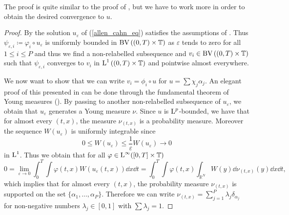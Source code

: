 \begin{remark}
	The proof is quite similar to the proof of , but we have to work more in order to obtain the desired convergence to $ u $.
\end{remark}

\begin{proof}
	By  the solution $ u_{ \varepsilon } $ of (\ref{allen_cahn_eq}) satisfies the assumptions of .
	Thus $ \psi_{ \varepsilon, i } \coloneqq \varphi_{ i } \circ u_{ 
	\varepsilon } $ is uniformly bounded in $ \operatorname{BV} \left( ( 0 , T ) \times 
	\operatorname{\mathbb{T}} \right) $ as $ \varepsilon $ tends to zero for all $ 1 \leq i 
	\leq P $ and thus we find a non-relabelled subsequence and $ v_{ i } \in 
	\operatorname{BV} \left( ( 0 , T ) \times \operatorname{\mathbb{T}} \right) $ such that $ \psi_{ 
	\varepsilon,  i } $ converges to $ v_{ i } $ in $ \operatorname{L}^{ 1 } \left( ( 0 , T 
	) 
	\times \operatorname{\mathbb{T}} \right) $ and pointwise almost everywhere. 
	
	We now want to show that we can write $ v_{ i } = \phi_{ i } \circ u $ for $ u = \sum \chi_{ j } \alpha_{ j } $. An elegant proof of this presented in \cite[Thm.~4.1]{fonseca_tartar_1989} can be done through the fundamental theorem of Young measures (\cite[Thm.~3.1]{Müller1999}). By passing to another non-relabelled subsequence of $ u_{ \varepsilon } $, we obtain that $ u_{ \varepsilon } $ generates a Young measure $ \nu $. Since $ u $ is $ \operatorname{L}^{ p } $-bounded, we have that for almost every $ (t, x ) $, the measure $ \nu_{ ( t, x ) } $ is a probability measure. Moreover the sequence $ W ( u_{ \varepsilon } ) $ is uniformly integrable since 
	\begin{equation*}
	 	0 \leq W ( u_{ \varepsilon } ) \leq \frac{ 1 }{ \varepsilon } W ( u_{ \varepsilon } ) \to 0 
	 \end{equation*}
 	in $ \operatorname{L}^{ 1 } $. Thus we obtain that for all $ \varphi \in \operatorname{L}^{ \infty } ( [ 0 , T ] \times \operatorname{\mathbb{T}} ) $
 	\begin{equation*}
 		0
 		=
 		\lim_{ \varepsilon \to 0 }
 			\int_{ 0 }^{ T }
 				\int
 					\varphi (t, x )
 					W ( u_{ \varepsilon } (t, x ) )
 				\dd{ x }
 			\dd{ t }
 		=
 		\int_{ 0 }^{ T }
 			\int
 				\varphi ( t, x ) 
				\int_{ \mathbb{ R }^{ N } }
					W ( y )
				\dd{ \nu_{ ( t, x ) } ( y ) }
 			\dd{ x }
 		\dd{ t },
 	\end{equation*}
 	which implies that for almost every $ ( t, x ) $, the probability measure $ \nu_{ ( t, x ) } $ is supported on the set $ \{ \alpha_{ 1 } , \dotsc, \alpha_{ P } \} $. Therefore we can write
 	$ \nu_{ ( t , x ) } = \sum_{ j = 1 }^{ P } \lambda_{ j } \delta_{ \alpha_{ j } } $ for non-negative numbers $ \lambda_{ j } \in [0 ,1 ] $ with $ \sum \lambda_{ j } = 1 $.
 	

\end{proof}
